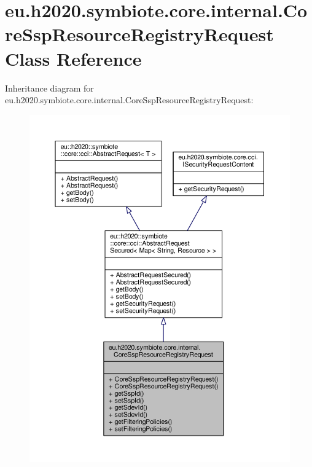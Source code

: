 \hypertarget{classeu_1_1h2020_1_1symbiote_1_1core_1_1internal_1_1CoreSspResourceRegistryRequest}{}\section{eu.\+h2020.\+symbiote.\+core.\+internal.\+Core\+Ssp\+Resource\+Registry\+Request Class Reference}
\label{classeu_1_1h2020_1_1symbiote_1_1core_1_1internal_1_1CoreSspResourceRegistryRequest}


Inheritance diagram for eu.\+h2020.\+symbiote.\+core.\+internal.\+Core\+Ssp\+Resource\+Registry\+Request\+:\nopagebreak
\begin{figure}[H]
\begin{center}
\leavevmode
\includegraphics[width=350pt]{classeu_1_1h2020_1_1symbiote_1_1core_1_1internal_1_1CoreSspResourceRegistryRequest__inherit__graph}
\end{center}
\end{figure}


